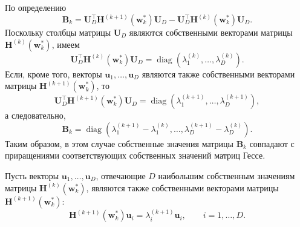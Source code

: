 \begin{remark}
    \label{rem:Bk-hessian-spectrum}
    По определению
    \begin{equation}
        \mathbf B_k
        =
        \mathbf U_D^\top \mathbf H^{(k+1)}(\mathbf w_k^*) \mathbf U_D
        -
        \mathbf U_D^\top \mathbf H^{(k)}(\mathbf w_k^*) \mathbf U_D.
    \end{equation}
    Поскольку столбцы матрицы $\mathbf U_D$ являются собственными векторами матрицы $\mathbf H^{(k)}(\mathbf w_k^*)$, имеем
    \begin{equation}
        \mathbf U_D^\top \mathbf H^{(k)}(\mathbf w_k^*) \mathbf U_D
        =
        \operatorname{diag}\left(
            \lambda_1^{(k)}, \ldots, \lambda_D^{(k)}
        \right).
    \end{equation}
    Если, кроме того, векторы $\mathbf u_1, \ldots, \mathbf u_D$ являются также собственными векторами матрицы $\mathbf H^{(k+1)}(\mathbf w_k^*)$, то
    \begin{equation}
        \mathbf U_D^\top \mathbf H^{(k+1)}(\mathbf w_k^*) \mathbf U_D
        =
        \operatorname{diag}\left(
            \lambda_1^{(k+1)}, \ldots, \lambda_D^{(k+1)}
        \right),
    \end{equation}
    а следовательно,
    \begin{equation}
        \label{eq:Bk-diagonal-eig-diffs}
        \mathbf B_k
        =
        \operatorname{diag}\left(
            \lambda_1^{(k+1)}-\lambda_1^{(k)},
            \ldots,
            \lambda_D^{(k+1)}-\lambda_D^{(k)}
        \right).
    \end{equation}
    Таким образом, в этом случае собственные значения матрицы $\mathbf B_k$ совпадают с приращениями соответствующих собственных значений матриц Гессе.
\end{remark}

\begin{assumption}
    \label{assumption:stable-principal-directions}
    Пусть векторы $\mathbf u_1, \ldots, \mathbf u_D$, отвечающие $D$ наибольшим собственным значениям матрицы $\mathbf H^{(k)}(\mathbf w_k^*)$, являются также собственными векторами матрицы $\mathbf H^{(k+1)}(\mathbf w_k^*)$:
    \begin{equation}
        \mathbf H^{(k+1)}(\mathbf w_k^*) \mathbf u_i
        =
        \lambda_i^{(k+1)} \mathbf u_i,
        \qquad i=1, \ldots, D.
    \end{equation}
\end{assumption}

